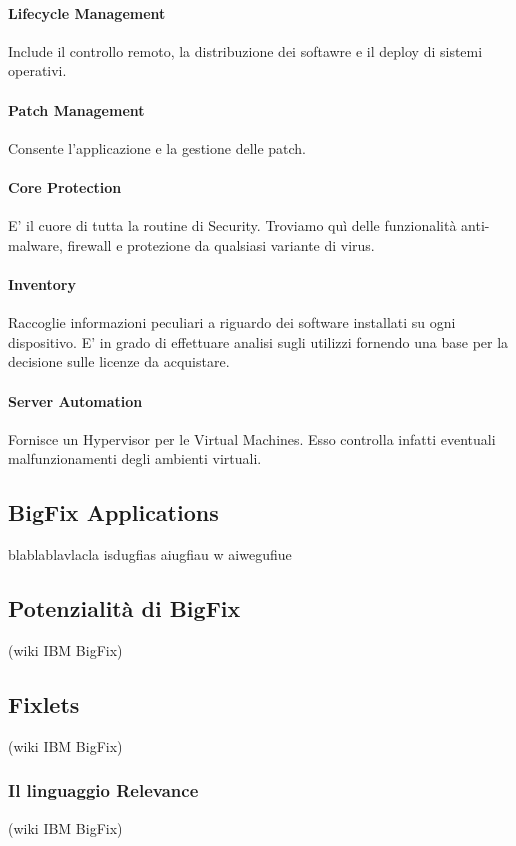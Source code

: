 \paragraph{Lifecycle Management}
Include il controllo remoto, la distribuzione dei softawre e il deploy di sistemi operativi.
\paragraph{Patch Management}
Consente l'applicazione e la gestione delle patch.
\paragraph{Core Protection}
E' il cuore di tutta la routine di Security. Troviamo quì delle funzionalità anti-malware, firewall e protezione da qualsiasi variante di virus.
\paragraph{Inventory }
Raccoglie informazioni peculiari a riguardo dei software installati su ogni dispositivo. E' in grado di effettuare analisi sugli utilizzi fornendo una base per la decisione sulle licenze da acquistare.
\paragraph{Server Automation}
Fornisce un Hypervisor per le Virtual Machines. Esso controlla infatti eventuali malfunzionamenti degli ambienti virtuali.
\subsection{BigFix Applications}
blablablavlacla isdugfias aiugfiau w aiwegufiue
\subsection{Potenzialità di BigFix}
(wiki IBM BigFix)
\subsection{Fixlets}
(wiki IBM BigFix)
\subsubsection{Il linguaggio Relevance}
(wiki IBM BigFix)


